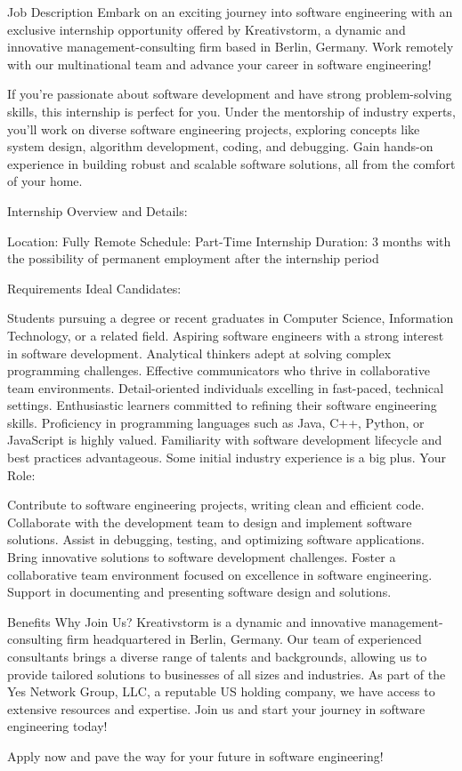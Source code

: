 Job Description
Embark on an exciting journey into software engineering with an exclusive internship opportunity offered by Kreativstorm, a dynamic and innovative management-consulting firm based in Berlin, Germany. Work remotely with our multinational team and advance your career in software engineering!

If you're passionate about software development and have strong problem-solving skills, this internship is perfect for you. Under the mentorship of industry experts, you'll work on diverse software engineering projects, exploring concepts like system design, algorithm development, coding, and debugging. Gain hands-on experience in building robust and scalable software solutions, all from the comfort of your home.

Internship Overview and Details:

Location: Fully Remote
Schedule: Part-Time Internship
Duration: 3 months with the possibility of permanent employment after the internship period


Requirements
Ideal Candidates:

Students pursuing a degree or recent graduates in Computer Science, Information Technology, or a related field.
Aspiring software engineers with a strong interest in software development.
Analytical thinkers adept at solving complex programming challenges.
Effective communicators who thrive in collaborative team environments.
Detail-oriented individuals excelling in fast-paced, technical settings.
Enthusiastic learners committed to refining their software engineering skills.
Proficiency in programming languages such as Java, C++, Python, or JavaScript is highly valued.
Familiarity with software development lifecycle and best practices advantageous.
Some initial industry experience is a big plus.
Your Role:

Contribute to software engineering projects, writing clean and efficient code.
Collaborate with the development team to design and implement software solutions.
Assist in debugging, testing, and optimizing software applications.
Bring innovative solutions to software development challenges.
Foster a collaborative team environment focused on excellence in software engineering.
Support in documenting and presenting software design and solutions.


Benefits
Why Join Us? Kreativstorm is a dynamic and innovative management-consulting firm headquartered in Berlin, Germany. Our team of experienced consultants brings a diverse range of talents and backgrounds, allowing us to provide tailored solutions to businesses of all sizes and industries. As part of the Yes Network Group, LLC, a reputable US holding company, we have access to extensive resources and expertise. Join us and start your journey in software engineering today!

Apply now and pave the way for your future in software engineering!


